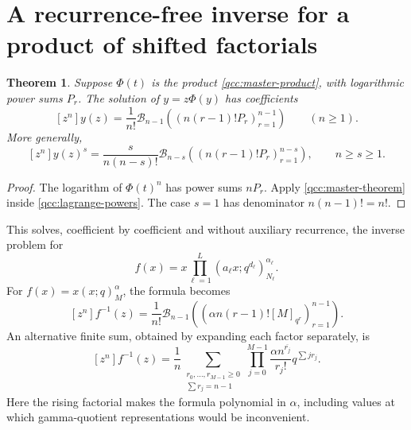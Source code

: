 \documentclass[11pt,a4paper,oneside,openany]{book}
\newtheorem{theorem}{Theorem}[chapter]
\theoremstyle{definition}
\theoremstyle{remark}
\newcommand{\Y}[1]{\mathcal B_{#1}}
\newcommand{\rising}[2]{#1^{\overline{#2}}}
\begin{document}
\section{A recurrence-free inverse for a product of shifted factorials}
\begin{theorem}\label{qcc:inverse-product}
Suppose \(\Phi(t)\) is the product \eqref{qcc:master-product}, with logarithmic
power sums \(P_r\). The solution of \(y=z\Phi(y)\) has coefficients
\begin{equation}\label{qcc:inverse-product-formula}
 [z^n]y(z)=\frac1{n!}\Y{n-1}
       \left(\left(n(r-1)!P_r\right)_{r=1}^{n-1}\right)\qquad(n\ge1).
\end{equation}
More generally,
\begin{equation}\label{qcc:inverse-product-powers}
 [z^n]y(z)^s=\frac{s}{n(n-s)!}\Y{n-s}
       \left(\left(n(r-1)!P_r\right)_{r=1}^{n-s}\right),\qquad n\ge s\ge1.
\end{equation}
\end{theorem}
\begin{proof}
The logarithm of \(\Phi(t)^n\) has power sums \(nP_r\).
Apply \cref{qcc:master-theorem} inside \eqref{qcc:lagrange-powers}.
The case \(s=1\) has denominator \(n(n-1)!=n!\).
\end{proof}
This solves, coefficient by coefficient and without auxiliary recurrence, the
inverse problem for
\[
 f(x)=x\prod_{\ell=1}^L(a_\ell x;q^{d_\ell})_{N_\ell}^{\alpha_\ell}.
\]
For \(f(x)=x(x;q)_M^\alpha\), the formula becomes
\begin{equation}\label{qcc:simple-inverse}
 [z^n]f^{-1}(z)=\frac1{n!}\Y{n-1}
   \left(\left(\alpha n(r-1)![M]_{q^r}\right)_{r=1}^{n-1}\right).
\end{equation}
An alternative finite sum, obtained by expanding each factor separately, is
\begin{equation}\label{qcc:simple-inverse-multisum}
 [z^n]f^{-1}(z)=\frac1n
 \sum_{\substack{r_0,\ldots,r_{M-1}\ge0\\\sum r_j=n-1}}
 \prod_{j=0}^{M-1}\frac{\rising{\alpha n}{r_j}}{r_j!}
 q^{\sum j r_j}.
\end{equation}
Here the rising factorial makes the formula polynomial in \(\alpha\), including
values at which gamma-quotient representations would be inconvenient.
\end{document}
